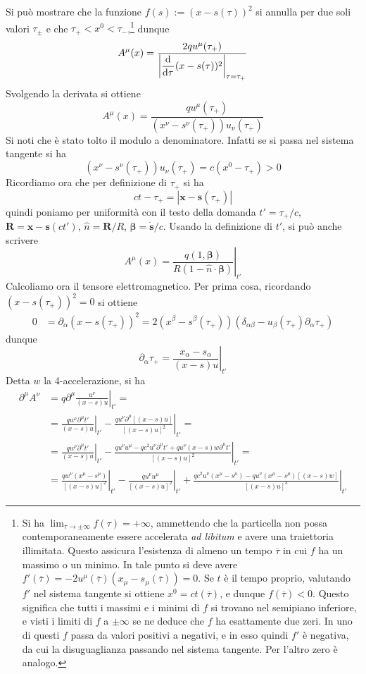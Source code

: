 \documentclass{article}
\renewcommand{\vec}[1]{\mathbf{#1}}
\begin{document}
\begin{enumerate}
	Si può mostrare che la funzione $f(s):=(x-s(\tau))^2$ si annulla per due soli valori $\tau_\pm$ e che $\tau_+<x^0<\tau_-$,\footnote{Si ha $\lim_{\tau\to\pm\infty}f(\tau)=+\infty$, ammettendo che la particella non possa contemporaneamente essere accelerata \textit{ad libitum} e avere una traiettoria illimitata. Questo assicura l'esistenza di almeno un tempo $\overline{\tau}$ in cui $f$ ha un massimo o un minimo. In tale punto si deve avere $f'(\overline{\tau})=-2u^\mu(\overline{\tau})(x_\mu-s_\mu(\overline{\tau}))=0$. Se $t$ è il tempo proprio, valutando $f'$ nel sistema tangente si ottiene $x^0=ct(\overline{\tau})$, e dunque $f(\overline{\tau})<0$. Questo significa che tutti i massimi e i minimi di $f$ si trovano nel semipiano inferiore, e visti i limiti di $f$ a $\pm\infty$ se ne deduce che $f$ ha esattamente due zeri. In uno di questi $f$ passa da valori positivi a negativi, e in esso quindi $f'$ è negativa, da cui la disuguaglianza passando nel sistema tangente. Per l'altro zero è analogo.} dunque
	\[A^\mu(x)=\frac{2qu^\mu(\tau_+)}{\left|\dfrac{\mathrm{d} ^{}}{\mathrm{d} {\tau}^{}}(x-s(\tau))^2\right|_{\tau=\tau_+}}\]
	Svolgendo la derivata si ottiene
	\[A^\mu(x)=\frac{qu^\mu(\tau_+)}{(x^\nu-s^\nu(\tau_+))u_\nu(\tau_+)}\]
	Si noti che è stato tolto il modulo a denominatore. Infatti se si passa nel sistema tangente si ha \[(x^\nu-s^\nu(\tau_+))u_\nu(\tau_+)=c(x^0-\tau_+)>0\]
	Ricordiamo ora che per definizione di $\tau_+$ si ha
	\[ct-\tau_+=|\vec{x}-\vec{s}(\tau_+)|\]
	quindi poniamo per uniformità con il testo della domanda $t'=\tau_+/c$, $\vec{R}=\vec{x}-\vec{s}(ct')$, $\hat{n}=\vec{R}/R$, $\bm{\beta}=\dot{\vec{s}}/c$. Usando la definizione di $t'$, si può anche scrivere
	\[A^\mu(x)=\left.\frac{q(1,\bm{\beta})}{R(1-\hat{n}\cdot\bm{\beta})}\right|_{t'}\]
	Calcoliamo ora il tensore elettromagnetico. Per prima cosa, ricordando $(x-s(\tau_+))^2=0$ si ottiene
	\begin{align*}
		0&=\partial_\alpha(x-s(\tau_+))^2=2(x^\beta-s^\beta(\tau_+))(\delta_{\alpha\beta}-u_\beta(\tau_+)\partial_\alpha \tau_+)	
	\end{align*}
	dunque
	\[\partial_\alpha \tau_+=\left.\frac{x_\alpha-s_\alpha}{(x-s)u}\right|_{t'}\]
	Detta $w$ la 4-accelerazione, si ha
	\begin{align*}
		\partial^\mu A^\nu&=q\partial^\mu\left.\frac{u^\nu}{(x-s)u}\right|_{t'}=\\&=\left.\frac{qw^\nu\partial^\mu t'}{(x-s)u}\right|_{t'}-\left.\frac{qu^\nu\partial^\mu[(x-s)u]}{[(x-s)u]^2}\right|_{t'}=\\&=\left.\frac{qw^\nu\partial^\mu t'}{(x-s)u}\right|_{t'}-\left.\frac{qu^\nu u^\mu-qc^2u^\nu\partial^\mu t'+qu^\nu(x-s)w\partial^\mu t'}{[(x-s)u]^2}\right|_{t'}=\\&=\left.\frac{qw^\nu(x^\mu-s^\mu)}{[(x-s)u]^2}\right|_{t'}-\left.\frac{qu^\nu u^\mu}{[(x-s)u]^2}\right|_{t'}+\left.\frac{qc^2u^\nu(x^\mu-s^\mu)-qu^\nu(x^\mu-s^\mu)[(x-s)w]}{[(x-s)u]^3}\right|_{t'}

\end{align*}
\end{enumerate}
\end{document}
